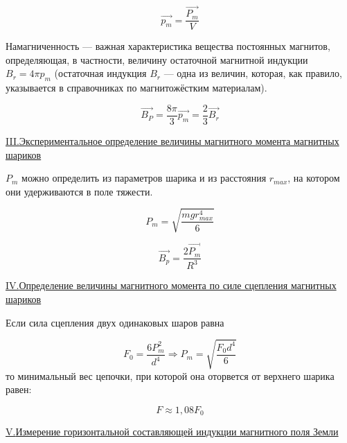 \documentclass{article}
\begin{document}
\begin{equation}
    \vec{p_m} = \dfrac{\vec{P_m}}{V}
\end{equation}

Намагниченность — важная характеристика вещества постоянных магнитов, определяющая, в частности, величину остаточной магнитной индукции $B_r = 4 \pi p_m$ (остаточная индукция $B_r$ --- одна из величин, которая, как правило, указывается в справочниках по магнитожёстким материалам).

\begin{equation}
    \vec{B_P} = \dfrac{8\pi}{3}\vec{p_m} = \dfrac{2}{3} \vec{B_r}
\end{equation}

\begin{center}
    \underline{\large {\RN{3}.{Экспериментальное определение величины магнитного момента магнитных шариков}}}
\end{center}

$P_m$ можно определить из параметров шарика и из расстояния $r_{max}$, на котором они удерживаются в поле тяжести.

\begin{equation}
    P_m = \sqrt{\dfrac{mgr_{max}^4}{6}}
\end{equation}

\begin{equation}
    \vec{B_p} = \dfrac{2\vec{P_m}}{R^3}
\end{equation}

\begin{center}
    \underline{\large {\RN{4}.{Определение величины магнитного момента по силе сцепления магнитных шариков}}}
\end{center}

Если сила сцепления двух одинаковых шаров равна 

\begin{equation}
    F_0 = \dfrac{6P_m^2}{d^4} \Rightarrow P_m = \sqrt{\dfrac{F_0d^4}{6}}
\end{equation}
то минимальный вес цепочки, при которой она оторвется от верхнего шарика равен:

\begin{equation}
    F \approx 1,08F_0
\end{equation}

\begin{center}
    \underline{\large {\RN{5}.{Измерение горизонтальной составляющей индукции магнитного поля Земли}}}
\end{center}
\end{document}
